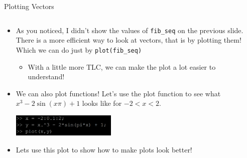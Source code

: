 {}\documentclass[letterpaper,
compress,
xcolor=x11names,
]{beamer}
\begin{document}
\begin{frame}{Plotting Vectors}
	\footnotesize
	\begin{columns}
		\begin{column}{0.6\linewidth}
			\begin{itemize}
				\item As you noticed, I didn't show the values of \texttt{fib\_seq} on the previous slide. There is a more efficient way to look at vectors, that is by plotting them! Which we can do just by \texttt{plot(fib\_seq)}	
				\begin{itemize}
					\item<2-> With a little more TLC, we can make the plot a lot easier to understand!
				\end{itemize}
				\item<3-> We can also plot functions! Let's use the plot function to see what $x^3 - 2\sin(x\pi) + 1$ looks like for $-2 < x < 2$.\\
				\begin{center}
					\includegraphics[width = 5cm]{function_plot_commands.png}
				\end{center}
				\item<3-> Lets use this plot to show how to make plots look better!				
			\end{itemize}
		\end{column}
		\begin{column}{0.4\linewidth}

\end{column}
\end{columns}
\end{frame}
\end{document}
